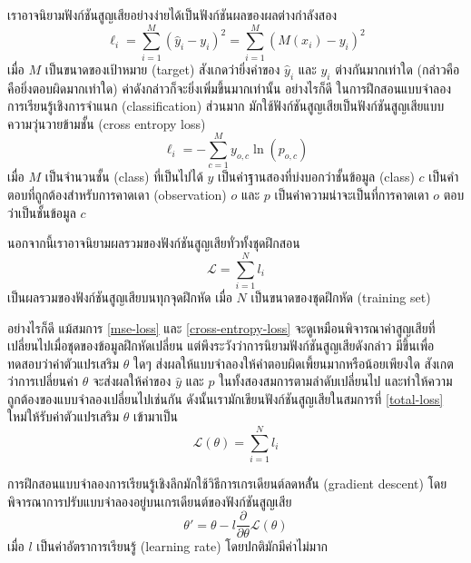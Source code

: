 \documentclass{cpepaper}
\begin{document}
เราอาจนิยามฟังก์ชันสูญเสียอย่างง่ายได้เป็นฟังก์ชันผลของผลต่างกำลังสอง
\begin{equation}
    \ell_i = \sum_{i=1}^{M}{(\hat{y}_i - y_i)^2} = \sum_{i=1}^{M}{(M(x_i) - y_i)^2}
    \label{mse-loss}
\end{equation}
เมื่อ $M$ เป็นขนาดของเป้าหมาย (target) สังเกดว่ายิ่งค่าของ $\hat{y}_i$ และ $y_i$ ต่างกันมากเท่าใด (กล่าวคือคือยิ่งตอบผิดมากเท่าใด) ค่าดังกล่าวก็จะยิ่งเพิ่มขึ้นมากเท่านั้น อย่างไรก็ดี ในการฝึกสอนแบบจำลองการเรียนรู้เชิงการจำแนก (classification) ส่วนมาก มักใช้ฟังก์ชันสูญเสียเป็นฟังก์ชันสูญเสียแบบความวุ่นวายข้ามชั้น (cross entropy loss)
\begin{equation}
    \ell_i = -\sum_{c=1}^{M}y_{o,c}\ln(p_{o,c})
    \label{cross-entropy-loss}
\end{equation}
เมื่อ $M$ เป็นจำนวนชั้น (class) ที่เป็นไปได้ $y$ เป็นค่าฐานสองที่บ่งบอกว่าชั้นข้อมูล (class) $c$ เป็นคำตอบที่ถูกต้องสำหรับการคาดเดา (observation) $o$ และ $p$ เป็นค่าความน่าจะเป็นที่การคาดเดา $o$ ตอบว่าเป็นชั้นข้อมูล $c$

นอกจากนี้เราอาจนิยามผลรวมของฟังก์ชันสูญเสียทั่วทั้งชุดฝึกสอน
\begin{equation}
    \mathcal{L} = \sum_{i=1}^{N}{l_i}
    \label{total-loss}
\end{equation}
เป็นผลรวมของฟังก์ชันสูญเสียบนทุกจุดฝึกหัด เมื่อ $N$ เป็นขนาดของชุดฝึกหัด (training set)

อย่างไรก็ดี แม้สมการ \ref{mse-loss} และ \ref{cross-entropy-loss} จะดูเหมือนพิจารณาค่าสูญเสียที่เปลี่ยนไปเมื่อชุดของข้อมูลฝึกหัดเปลี่ยน แต่พึงระวังว่าการนิยามฟังก์ชันสูญเสียดังกล่าว มีขึ้นเพื่อทดสอบว่าค่าตัวแปรเสริม $\theta$ ใดๆ ส่งผลให้แบบจำลองให้คำตอบผิดเพี้ยนมากหรือน้อยเพียงใด สังเกตว่าการเปลี่ยนค่า $\theta$ จะส่งผลให้ค่าของ $\hat{y}$ และ $p$ ในทั้งสองสมการตามลำดับเปลี่ยนไป และทำให้ความถูกต้องของแบบจำลองเปลี่ยนไปเช่นกัน ดังนั้นเรามักเขียนฟังก์ชันสูญเสียในสมการที่ \ref{total-loss} ใหม่ให้รับค่าตัวแปรเสริม $\theta$ เข้ามาเป็น
\begin{equation}
    \mathcal{L}(\theta) = \sum_{i=1}^{N}{l_i}
    \label{total-loss-theta}
\end{equation}

การฝึกสอนแบบจำลองการเรียนรู้เชิงลึกมักใช้วิธีการเกรเดียนต์ลดหลัั่น (gradient descent) โดยพิจารณาการปรับแบบจำลองอยู่บนเกรเดียนต์ของฟังก์ชันสูญเสีย
\begin{equation}
    \theta' = \theta - l \frac{\partial}{\partial \theta}{\mathcal{L}(\theta)}
    \label{gradient-descent}
\end{equation}
เมื่อ $l$ เป็นค่าอัตราการเรียนรู้ (learning rate) โดยปกติมักมีค่าไม่มาก
\end{document}
